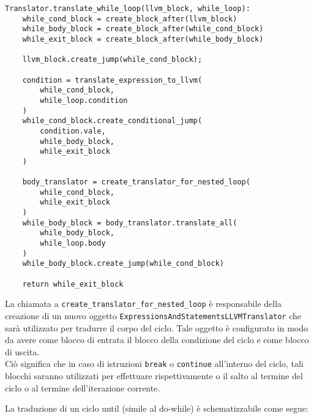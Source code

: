 \vspace{0.5cm}
\begin{lstlisting}[frame=single]
Translator.translate_while_loop(llvm_block, while_loop):
    while_cond_block = create_block_after(llvm_block)
    while_body_block = create_block_after(while_cond_block)
    while_exit_block = create_block_after(while_body_block)

    llvm_block.create_jump(while_cond_block);

    condition = translate_expression_to_llvm(
        while_cond_block, 
        while_loop.condition
    )
    while_cond_block.create_conditional_jump(
        condition.vale, 
        while_body_block, 
        while_exit_block
    )

    body_translator = create_translator_for_nested_loop(
        while_cond_block, 
        while_exit_block
    )
    while_body_block = body_translator.translate_all(
        while_body_block,
        while_loop.body
    )
    while_body_block.create_jump(while_cond_block)

    return while_exit_block
\end{lstlisting}
\vspace{0.5cm}

La chiamata a \texttt{create\_translator\_for\_nested\_loop} è responsabile della creazione di un nuovo oggetto
\texttt{ExpressionsAndStatementsLLVMTranslator} che sarà utilizzato per tradurre il corpo del ciclo. Tale oggetto
è configurato in modo da avere come blocco di entrata il blocco della condizione del ciclo e come blocco di uscita. \\

Ciò significa che in caso di istruzioni \texttt{break} o \texttt{continue} all'interno del ciclo, tali blocchi saranno 
utilizzati per effettuare rispettivamente o il salto al termine del ciclo o al termine dell'iterazione corrente. \\

\newpage

La traduzione di un ciclo until (simile al do-while) è schematizzabile come segue:


